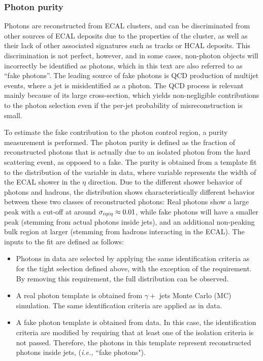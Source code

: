 \subsubsection{Photon purity}
\label{subsec:photonpurity}

Photons are reconstructed from ECAL clusters, and can be discriminated from other sources of ECAL deposits due 
to the properties of the cluster, as well as their lack of other associated signatures such as tracks or HCAL 
deposits. This discrimination is not perfect, however, and in some cases, non-photon objects will incorrectly be 
identified as photons, which in this text are also referred to as ``fake photons''.
The leading source of fake photons is QCD production of multijet events, where 
a jet is misidentified as a photon. The QCD process is relevant mainly because of its large cross-section, which yields non-negligible 
contributions to the photon selection even if the per-jet probability of misreconstruction is small.

To estimate the fake contribution to the photon control region, a purity measurement is performed. The photon purity is 
defined as the fraction of reconstructed photons that is actually due to an isolated photon from the hard scattering event, 
as opposed to a fake. The purity is obtained from a template fit to the distribution of the \sieie variable in data, where 
\sieie variable represents the width of the ECAL shower in the $\eta$ direction. Due to the different shower behavior of 
photons and hadrons, the \sieie distribution shows characteristically different behavior between these two classes of 
reconstructed photons: Real photons show a large peak with a cut-off at around $\sigma_{i\eta i\eta}\approx0.01$, while fake photons will 
have a smaller peak (stemming from actual photons inside jets), and an additional non-peaking bulk region at larger 
\sieie (stemming from hadrons interacting in the ECAL). The inputs to the fit are defined as follows:

\begin{itemize}
\item Photons in data are selected by applying the same identification criteria as for the tight selection defined above, 
with the exception of the \sieie requirement. By removing this requirement, the full \sieie distribution can be observed.

\item A real photon template is obtained from $\gamma +$ jets Monte Carlo (MC) simulation. The same identification criteria are applied as in data.

\item A fake photon template is obtained from data. In this case, the identification criteria are modified by requiring that 
at least one of the isolation criteria is not passed. Therefore, the photons in this template represent reconstructed photons inside jets,
(\textit{i.e.,} ``fake photons").

\end{itemize}


